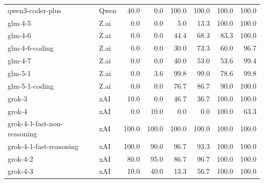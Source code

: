 \begin{longtable}{llrrrrrr}
qwen3-coder-plus & Qwen & 40.0 & 0.0 & 100.0 & 100.0 & 100.0 & 100.0 \\
glm-4-5 & Z.ai & 0.0 & 0.0 & 5.0 & 13.3 & 100.0 & 100.0 \\
glm-4-6 & Z.ai & 0.0 & 0.0 & 44.4 & 68.3 & 83.3 & 100.0 \\
glm-4-6-coding & Z.ai & 0.0 & 0.0 & 30.0 & 73.3 & 60.0 & 96.7 \\
glm-4-7 & Z.ai & 0.0 & 0.0 & 40.0 & 53.0 & 53.6 & 99.4 \\
glm-5-1 & Z.ai & 0.0 & 3.6 & 99.8 & 99.0 & 78.6 & 99.8 \\
glm-5-1-coding & Z.ai & 0.0 & 0.0 & 76.7 & 86.7 & 90.0 & 100.0 \\
grok-3 & xAI & 10.0 & 0.0 & 46.7 & 36.7 & 100.0 & 100.0 \\
grok-4 & xAI & 0.0 & 10.0 & 0.0 & 0.0 & 100.0 & 63.3 \\
grok-4-1-fast-non-reasoning & xAI & 100.0 & 100.0 & 100.0 & 100.0 & 100.0 & 100.0 \\
grok-4-1-fast-reasoning & xAI & 100.0 & 90.0 & 96.7 & 93.3 & 100.0 & 100.0 \\
grok-4-2 & xAI & 80.0 & 95.0 & 86.7 & 96.7 & 100.0 & 100.0 \\
grok-4-3 & xAI & 10.0 & 40.0 & 13.3 & 56.7 & 100.0 & 100.0 \\
\bottomrule
\end{longtable}

